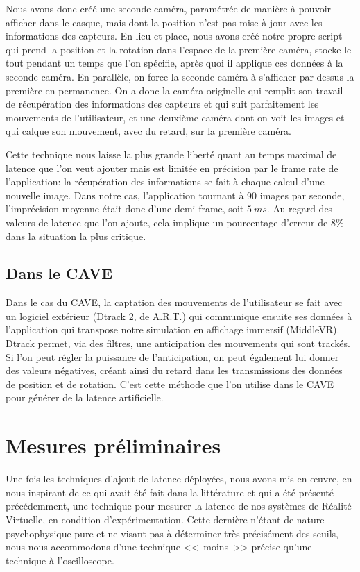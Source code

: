	\par Nous avons donc créé une seconde caméra, paramétrée de manière à pouvoir afficher dans le casque, mais dont la position n'est pas mise à jour avec les informations des capteurs. En lieu et place, nous avons créé notre propre script qui prend la position et la rotation dans l'espace de la première caméra, stocke le tout pendant un temps que l'on spécifie, après quoi il applique ces données à la seconde caméra. En parallèle, on force la seconde caméra à s'afficher par dessus la première en permanence. On a donc la caméra originelle qui remplit son travail de récupération des informations des capteurs et qui suit parfaitement les mouvements de l'utilisateur, et une deuxième caméra dont on voit les images et qui calque son mouvement, avec du retard, sur la première caméra.
	
	
	\par Cette technique nous laisse la plus grande liberté quant au temps maximal de latence que l'on veut ajouter mais est limitée en précision par le frame rate de l'application: la récupération des informations se fait à chaque calcul d'une nouvelle image. Dans notre cas, l'application tournant à 90 images par seconde, l'imprécision moyenne était donc d'une demi-frame, soit $5~ms$. Au regard des valeurs de latence que l'on ajoute, cela implique un pourcentage d'erreur de 8\% dans la situation la plus critique.
	
	\subsection{Dans le CAVE}	
	\par Dans le cas du CAVE, la captation des mouvements de l'utilisateur se fait avec un logiciel extérieur (Dtrack 2, de A.R.T.) qui communique ensuite ses données à l'application qui transpose notre simulation en affichage immersif (MiddleVR). Dtrack permet, via des filtres, une anticipation des mouvements qui sont trackés. Si l'on peut régler la puissance de l'anticipation, on peut également lui donner des valeurs négatives, créant ainsi du retard dans les transmissions des données de position et de rotation. C'est cette méthode que l'on utilise dans le CAVE pour générer de la latence artificielle.
	
	
	\section{Mesures préliminaires}
	\label{sec:mesures_prelim_latence}
	\par Une fois les techniques d'ajout de latence déployées, nous avons mis en œuvre, en nous inspirant de ce qui avait été fait dans la littérature et qui a été présenté précédemment, une technique pour mesurer la latence de nos systèmes de Réalité Virtuelle, en condition d'expérimentation. Cette dernière n'étant de nature psychophysique pure et ne visant pas à déterminer très précisément des seuils, nous nous accommodons d'une technique <<~moins~>> précise qu'une technique à l'oscilloscope.
	
